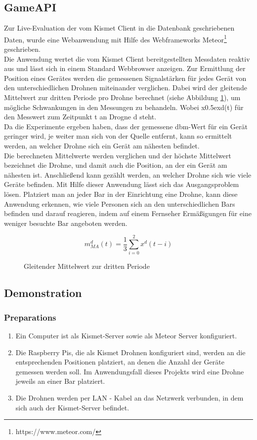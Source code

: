 \documentclass[a4paper]{spie}  %
\begin{document}
\subsection{GameAPI}
Zur Live-Evaluation der vom Kismet Client in die Datenbank geschriebenen Daten, wurde eine Webanwendung mit Hilfe des Webframeworks Meteor\footnote{https://www.meteor.com/} geschrieben. \\
Die Anwendung wertet die vom Kismet Client bereitgestellten Messdaten reaktiv aus und lässt sich in einem Standard Webbrowser anzeigen.
Zur Ermittlung der Position eines Gerätes werden die gemessenen Signalstärken für jedes Gerät von den unterschiedlichen Drohnen miteinander verglichen. Dabei wird der gleitende Mittelwert zur dritten Periode pro Drohne berechnet (siehe Abbildung \ref{eqn:middle}), um mögliche Schwankungen in den Messungen zu behandeln. Wobei x\raise0.5ex\hbox{d}(t) für den Messwert zum Zeitpunkt t an Drogne d steht.
\\Da die Experimente ergeben haben, dass der gemessene dbm-Wert für ein Gerät geringer wird, je weiter man sich von der Quelle entfernt, kann so ermittelt werden, an welcher Drohne sich ein Gerät am nähesten befindet. \\
Die berechneten Mittelwerte werden verglichen und der höchste Mittelwert bezeichnet die Drohne, und damit auch die Position, an der ein Gerät am nähesten ist. Anschließend kann gezählt werden, an welcher Drohne sich wie viele Geräte befinden. Mit Hilfe dieser Anwendung lässt sich das Ausgangsproblem lösen. Platziert man an jeder Bar in der Einrichtung eine Drohne, kann diese Anwendung erkennen, wie viele Personen sich an den unterschiedlichen Bars befinden und darauf reagieren, indem auf einem Fernseher Ermäßigungen für eine weniger besuchte Bar angeboten werden.
\begin{figure}
\begin{equation}
  \boxed{{ m }_{ MA }^{ d }(t) = \frac { 1 }{ 3 } \sum _{ i=0 }^{ 2 }{ { x }^{ d }(t-i) }}
\end{equation}
\caption{Gleitender Mittelwert zur dritten Periode}
\label{eqn:middle}
\end{figure}

\subsection{Demonstration}
\subsubsection{Preparations}
\begin{enumerate}
 \item Ein Computer ist als Kismet-Server sowie als Meteor Server konfiguriert.
 \item Die Raspberry Pis, die als Kismet Drohnen konfiguriert sind, werden an die entsprechenden Positionen platziert, an denen die Anzahl der Geräte gemessen werden soll. Im Anwendungsfall dieses Projekts wird eine Drohne jeweils an einer Bar platziert. 
 \item Die Drohnen werden per LAN - Kabel an das Netzwerk verbunden, in dem sich auch der Kismet-Server befindet.
\end{enumerate}
\end{document}
